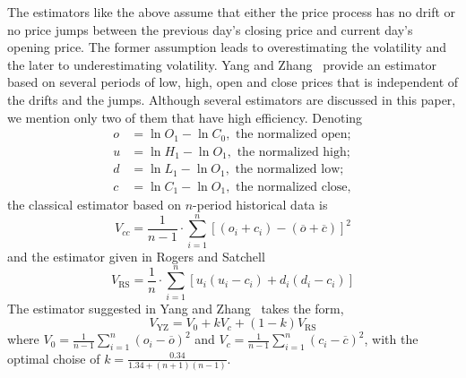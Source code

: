 The estimators like the above assume that either the price process has no drift or no price jumps between the previous day's closing price and current day's opening price. The former assumption leads to overestimating the volatility and the later to underestimating volatility. Yang and Zhang~\cite{yangzhang2000} provide an estimator based on several periods of low, high, open and close prices that is independent of the drifts and the jumps. Although several estimators are discussed in this paper, we mention only two of them that have high efficiency. Denoting
	\[
	\begin{split}
	o&= \ln O_1 - \ln C_0, \text{ the normalized open}; \\
	u&= \ln H_1 - \ln O_1, \text{ the normalized high}; \\
	d&= \ln L_1 - \ln O_1, \text{ the normalized low}; \\
	c&= \ln C_1 - \ln O_1,  \text{ the normalized close},
	\end{split}
	\]
the classical estimator based on $n$-period historical data is
	\begin{equation} \label{eqn:nperioddata}
	V_{cc}= \dfrac{1}{n-1} \cdot \sum_{i=1}^n [(o_i + c_i) - (\overline{o} + \overline{c})]^2
	\end{equation}
and the estimator given in Rogers and Satchell~\cite{rogerssatchell1991}
	\begin{equation} \label{eqn:rogerssatchell}
	V_{\text{RS}}= \dfrac{1}{n} \cdot \sum_{i=1}^n [u_i(u_i - c_i) + d_i(d_i-c_i)]
	\end{equation}
The estimator suggested in Yang and Zhang~\cite{yangzhang2000} takes the form,
	\begin{equation} \label{eqn:yang2000}
	V_{\text{YZ}}= V_0 + k V_c + (1-k)V_{\text{RS}}
	\end{equation}
where $V_0= \frac{1}{n-1} \sum_{i=1}^n (o_i - \overline{o})^2$ and $V_c= \frac{1}{n-1} \sum_{i=1}^n (c_i - \overline{c})^2$, with the optimal choise of $k= \frac{0.34}{1.34 + (n+1)(n-1)}$. \\


